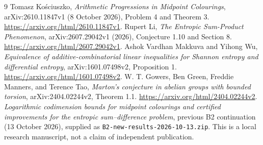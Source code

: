 \documentclass[11pt]{article}
\theoremstyle{remark}
\begin{document}
\begingroup\small
\begin{thebibliography}{9}\setlength{\itemsep}{3pt}\setlength{\parskip}{0pt}
Tomasz Ko\'sciuszko, \emph{Arithmetic Progressions in Midpoint Colourings},
arXiv:2610.11847v1 (8 October 2026), Problem 4 and Theorem 3.
\url{https://arxiv.org/html/2610.11847v1}.
Rupert Li, \emph{The Entropic Sum-Product Phenomenon},
arXiv:2607.29042v1 (2026), Conjecture 1.10 and Section 8.
\url{https://arxiv.org/html/2607.29042v1}.
Ashok Vardhan Makkuva and Yihong Wu,
\emph{Equivalence of additive-combinatorial linear inequalities for Shannon
entropy and differential entropy}, arXiv:1601.07498v2, Proposition 1.
\url{https://arxiv.org/html/1601.07498v2}.
W. T. Gowers, Ben Green, Freddie Manners, and Terence Tao,
\emph{Marton's conjecture in abelian groups with bounded torsion},
arXiv:2404.02244v2, Theorem 1.1.
\url{https://arxiv.org/html/2404.02244v2}.
\emph{Logarithmic codimension bounds for midpoint colourings and certified
improvements for the entropic sum--difference problem}, previous B2
continuation (13 October 2026), supplied as
\texttt{B2-new-results-2026-10-13.zip}. This is a local research manuscript,
not a claim of independent publication.
\end{thebibliography}
\endgroup
\end{document}
